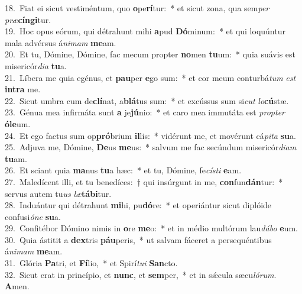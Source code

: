 {18.~}Fiat ei sicut vestiméntum, quo \textbf{o}pe\textbf{rí}tur:~* et sicut zona, qua sem\textit{per} \textit{præ}\textbf{cín}\textbf{gi}tur.\\
{19.~}Hoc opus eórum, qui détrahunt mihi \textbf{a}pud \textbf{Dó}minum:~* et qui loquúntur mala advérsus á\textit{ni}\textit{mam} \textbf{me}am.\\
{20.~}Et tu, Dómine, Dómine, fac mecum propter \textbf{no}men \textbf{tu}um:~* quia suávis est misericór\textit{di}\textit{a} \textbf{tu}a.\\
{21.~}Líbera me quia egénus, et \textbf{pau}per \textbf{e}go sum:~* et cor meum conturbá\textit{tum} \textit{est} \textbf{in}\textbf{tra} me.\\
{22.~}Sicut umbra cum de\textbf{clí}nat, a\textbf{blá}tus sum:~* et excússus sum si\textit{cut} \textit{lo}\textbf{cú}stæ.\\
{23.~}Génua mea infirmáta sunt \textbf{a} je\textbf{jú}nio:~* et caro mea immutáta est \textit{prop}\textit{ter} \textbf{ó}\textbf{le}um.\\
{24.~}Et ego factus sum op\textbf{pró}brium \textbf{il}lis:~* vidérunt me, et movérunt cá\textit{pi}\textit{ta} \textbf{su}a.\\
{25.~}Adjuva me, Dómine, \textbf{De}us \textbf{me}us:~* salvum me fac secúndum misericór\textit{di}\textit{am} \textbf{tu}am.\\
{26.~}Et sciant quia \textbf{ma}nus \textbf{tu}a hæc:~* et tu, Dómine, fe\textit{cí}\textit{sti} \textbf{e}am.\\
{27.~}Maledícent illi, et tu benedíces:~† qui insúrgunt in me, \textbf{con}fun\textbf{dán}tur:~* servus autem tu\textit{us} \textit{læ}\textbf{tá}\textbf{bi}tur.\\
{28.~}Induántur qui détrahunt \textbf{mi}hi, pu\textbf{dó}re:~* et operiántur sicut diplóide confusi\textit{ó}\textit{ne} \textbf{su}a.\\
{29.~}Confitébor Dómino nimis in \textbf{o}re \textbf{me}o:~* et in médio multórum lau\textit{dá}\textit{bo} \textbf{e}um.\\
{30.~}Quia ástitit a \textbf{dex}tris \textbf{páu}peris,~* ut salvam fáceret a persequéntibus á\textit{ni}\textit{mam} \textbf{me}am.\\
{31.~}Glória \textbf{Pa}tri, et \textbf{Fí}lio,~* et Spirí\textit{tu}\textit{i} \textbf{San}cto.\\
{32.~}Sicut erat in princípio, et \textbf{nunc}, et \textbf{sem}per,~* et in sǽcula sæcu\textit{ló}\textit{rum}. \textbf{A}men.\\
